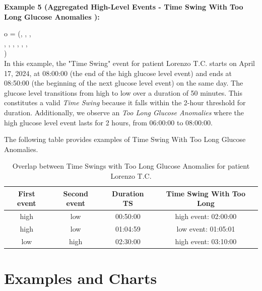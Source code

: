 \documentclass{article}
\begin{document}
\begin{enumerate}
    \textbf{Example 5 (Aggregated High-Level Events - Time Swing With Too Long Glucose Anomalies ):}
    
    o = (, ,  , \\ , , , , , , \\ )\\
    
    In this example, the "Time Swing" event for patient Lorenzo T.C. starts on April 17, 2024, at 08:00:00 (the end of the high glucose level event) and ends at 08:50:00 (the beginning of the next glucose level event) on the same day. The glucose level transitions from high to low over a duration of 50 minutes. This constitutes a valid \textit{Time Swing} because it falls within the 2-hour threshold for duration. Additionally, we observe an \textit{Too Long Glucose Anomalies} where the high glucose level event lasts for 2 hours, from 06:00:00 to 08:00:00.
    
    The following table provides examples of Time Swing With Too Long Glucose Anomalies.
    
    
    \begin{table}[h!]
        \centering
        \begin{tabular}{|c|c|c|c|}
            \hline
            \textbf{First event} & \textbf{Second event} & \textbf{Duration TS} & \textbf{Time Swing With Too Long} \\
            \hline
            high & low & 00:50:00 & high event: 02:00:00 \\
            \hline
            high & low & 01:04:59 & low event: 01:05:01 \\
            \hline
            low & high & 02:30:00 & high event: 03:10:00 \\
            \hline
        \end{tabular}
        \caption{Overlap between Time Swings with Too Long Glucose Anomalies for patient Lorenzo T.C.}
        \label{tab:time_swing_with_too_long_glucose_anomalies}
    \end{table}
    
\end{enumerate}


\section{Examples and Charts}
\end{document}
